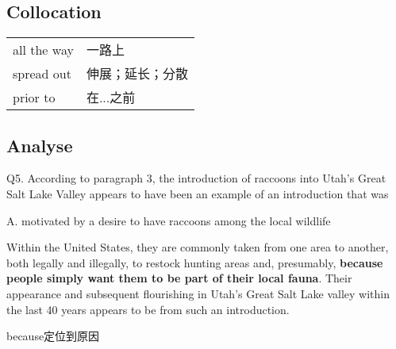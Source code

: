 \subsection{Collocation}

\begin{tabular}{ll}
    all the way & 一路上      \\
    spread out  & 伸展；延长；分散 \\
    prior to    & 在...之前   \\
\end{tabular}

\subsection{Analyse}

\begin{blk}
    \begin{qst}
        Q5. According to paragraph 3, the introduction of raccoons into Utah’s Great Salt Lake Valley appears to have been an example of an introduction that was
    \end{qst}

    \begin{chc}
        A. motivated by a desire to have raccoons among the local wildlife
    \end{chc}

    \begin{psgq}
        Within the United States, they are commonly taken from one area to another, both legally and illegally, to restock hunting areas and, presumably, \textbf{because people simply want them to be part of their local fauna}. Their appearance and subsequent flourishing in Utah’s Great Salt Lake valley within the last 40 years appears to be from such an introduction.
    \end{psgq}

    \begin{nlz}
        because定位到原因
    \end{nlz}
\end{blk}

